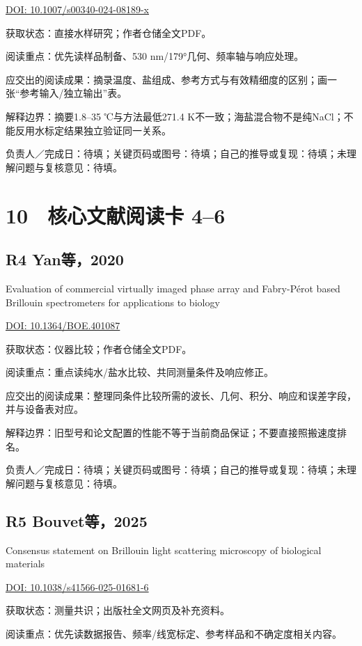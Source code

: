 \documentclass[UTF8,a4paper,11pt,fontset=fandol]{ctexart}
\begin{document}
\noindent\href{https://doi.org/10.1007/s00340-024-08189-x}{DOI: 10.1007/s00340-024-08189-x}\par\smallskip
获取状态：直接水样研究；作者仓储全文PDF。

阅读重点：优先读样品制备、530 nm/179°几何、频率轴与响应处理。

应交出的阅读成果：摘录温度、盐组成、参考方式与有效精细度的区别；画一张“参考输入/独立输出”表。

解释边界：摘要1.8–35 ℃与方法最低271.4 K不一致；海盐混合物不是纯NaCl；不能反用水标定结果独立验证同一关系。

负责人／完成日：待填；关键页码或图号：待填；自己的推导或复现：待填；未理解问题与复核意见：待填。

\clearpage
\section*{10　核心文献阅读卡 4–6}
\subsection*{R4 Yan等，2020}
Evaluation of commercial virtually imaged phase array and Fabry-Pérot based Brillouin spectrometers for applications to biology

\noindent\href{https://doi.org/10.1364/BOE.401087}{DOI: 10.1364/BOE.401087}\par\smallskip
获取状态：仪器比较；作者仓储全文PDF。

阅读重点：重点读纯水/盐水比较、共同测量条件及响应修正。

应交出的阅读成果：整理同条件比较所需的波长、几何、积分、响应和误差字段，并与设备表对应。

解释边界：旧型号和论文配置的性能不等于当前商品保证；不要直接照搬速度排名。

负责人／完成日：待填；关键页码或图号：待填；自己的推导或复现：待填；未理解问题与复核意见：待填。

\subsection*{R5 Bouvet等，2025}
Consensus statement on Brillouin light scattering microscopy of biological materials

\noindent\href{https://doi.org/10.1038/s41566-025-01681-6}{DOI: 10.1038/s41566-025-01681-6}\par\smallskip
获取状态：测量共识；出版社全文网页及补充资料。

阅读重点：优先读数据报告、频率/线宽标定、参考样品和不确定度相关内容。
\end{document}
